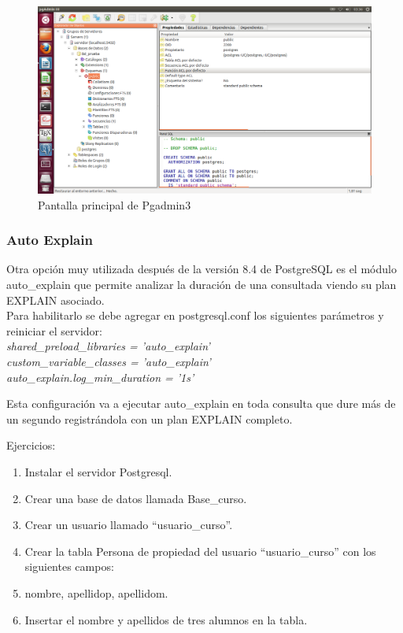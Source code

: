 \begin{figure}[ht!]
   \centering
   \includegraphics[scale=0.35]{imagenes/pgadmin3.png}
   \caption{Pantalla principal de Pgadmin3}\label{graf:pgadmin3}
\end{figure}

\subsubsection{Auto Explain}

Otra opción muy utilizada después de la versión 8.4 de PostgreSQL es el módulo auto\_explain que permite analizar la duración de una consultada viendo su plan EXPLAIN asociado.\\

Para habilitarlo se debe agregar en postgresql.conf los siguientes parámetros y reiniciar el servidor:\\

\emph{shared\_preload\_libraries = 'auto\_explain'\\
custom\_variable\_classes = 'auto\_explain' \\
auto\_explain.log\_min\_duration = '1s'\\}

Esta configuración va a ejecutar auto\_explain en toda consulta que dure más de un segundo registrándola con un plan EXPLAIN completo.



\newpage

Ejercicios:

\begin{enumerate}
\item Instalar el servidor Postgresql.
\item Crear una base de datos llamada Base\_curso.
\item Crear un usuario llamado “usuario\_curso”.
\item Crear la tabla Persona de propiedad del usuario “usuario\_curso” con los siguientes campos:
\item nombre, apellidop, apellidom.
\item Insertar el nombre y apellidos de tres alumnos en la tabla.
\end{enumerate}



